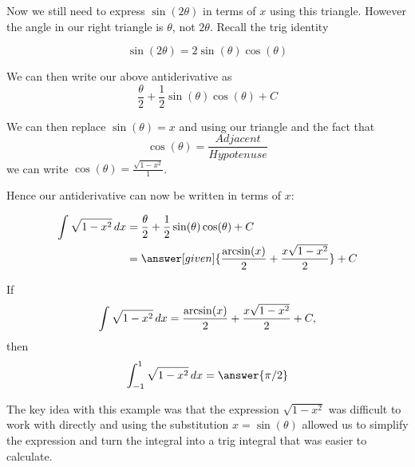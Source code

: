 \documentclass{ximera}
\begin{document}
\begin{example}
\begin{explanation}
    \begin{image}
    \end{image}

Now we still need to express $\sin(2\theta)$ in terms of $x$ using this triangle. However the angle in our 
right triangle is $\theta$, not $2\theta$. Recall the trig identity

\[
\sin(2\theta)=2\sin(\theta)\cos(\theta)
\]

We can then write our above antiderivative as 
\[
\frac{\theta}{2} +\frac{1}{2}\sin(\theta)\cos(\theta) + C
\]

We can then replace $\sin(\theta)=x$ and using our triangle and the fact that 
\[
\cos(\theta)=\frac{Adjacent}{Hypotenuse}
\]
we can write $\cos(\theta)=\frac{\sqrt{1-x^{2}}}{1}$.

Hence our antiderivative can now be written in terms of $x$:

    \begin{align*}
      \int \sqrt{1-x^2} \d x &= \frac{\theta}{2} +\frac{1}{2}\sin(\theta)\cos(\theta)+C \\
      &= \answer[given]{\frac{\arcsin(x)}{2} + \frac{x\sqrt{1-x^2}}{2}} + C 
    \end{align*}
  \end{explanation}
\end{example}

\begin{question}
  If
  \[
  \int \sqrt{1-x^2} \mathop{}\!d x = \frac{\arcsin(x)}{2} + \frac{x\sqrt{1-x^2}}{2} + C,
  \]
  then
  \[
  \int_{-1}^{1}\sqrt{1-x^2} \d x = \answer{\pi/2}
  \]
\end{question}



The key idea with this example was that the expression $\sqrt{1-x^{2}}$ was difficult to work with directly and 
using the substitution $x=\sin(\theta)$ allowed us to simplify the expression and turn the integral 
into a trig integral that was easier to calculate. 
\end{document}
